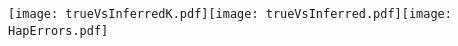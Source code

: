 \documentclass[preview]{standalone}
\begin{document}
\texttt{[image: trueVsInferredK.pdf]}\texttt{[image: trueVsInferred.pdf]}\texttt{[image: HapErrors.pdf]}
\end{document}
